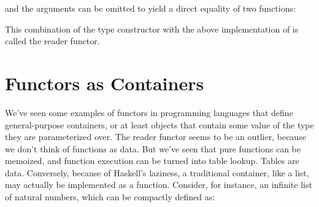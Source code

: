and the arguments can be omitted to yield a direct equality of two
functions:

This combination of the type constructor 
with the above implementation of  is called the reader
functor.

\section{Functors as Containers}

We've seen some examples of functors in programming languages that
define general-purpose containers, or at least objects that contain some
value of the type they are parameterized over. The reader functor seems
to be an outlier, because we don't think of functions as data. But we've
seen that pure functions can be memoized, and function execution can be
turned into table lookup. Tables are data. Conversely, because of
Haskell's laziness, a traditional container, like a list, may actually
be implemented as a function. Consider, for instance, an infinite list
of natural numbers, which can be compactly defined as:

